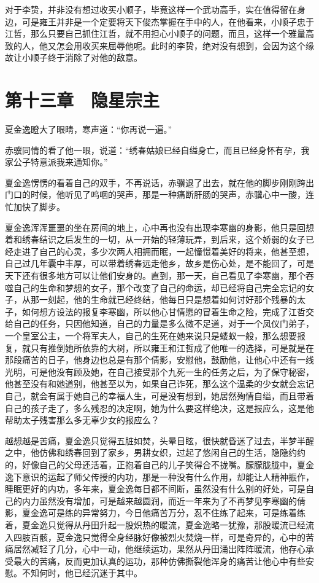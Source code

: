 对于李贽，并非没有想过收买小顺子，毕竟这样一个武功高手，实在值得留在身边，可是雍王并非是一个定要将天下俊杰掌握在手中的人，在他看来，小顺子忠于江哲，那么只要自己抓住江哲，就不用担心小顺子的问题，而且，这样一个雅量高致的人，他又怎会用收买来屈辱他呢。此时的李贽，绝对没有想到，会因为这个缘故让小顺子终于消除了对他的敌意。

\chapter{第十三章　隐星宗主}

夏金逸瞪大了眼睛，寒声道：“你再说一遍。”

赤骥同情的看了他一眼，说道：“绣春姑娘已经自缢身亡，而且已经身怀有孕，我家公子特意派我来通知你。”

夏金逸愣愣的看着自己的双手，不再说话，赤骥退了出去，就在他的脚步刚刚跨出门口的时候，他听见了呜咽的哭声，那是一种痛断肝肠的哭声，赤骥心中一酸，连忙加快了脚步。

夏金逸浑浑噩噩的坐在房间的地上，心中再也没有出现李寒幽的身影，他只是回想着和绣春结识之后发生的一切，从一开始的轻薄玩弄，到后来，这个娇弱的女子已经走进了自己的心灵，多少次两人相拥而眠，一起憧憬着美好的将来，他甚至想，自己过几年囊中丰厚，可以带着绣春远走他乡，故乡是伤心处，是不能回了，可是天下还有很多地方可以让他们安身的。直到，那一天，自己看见了李寒幽，那个吞噬自己的生命和梦想的女子，那个改变了自己的命运，却已经将自己完全忘记的女子，从那一刻起，他的生命就已经终结，他每日只是想着如何讨好那个残暴的太子，如何想方设法的报复李寒幽，所以他心甘情愿的冒着生命之险，完成了江哲交给自己的任务，只因他知道，自己的力量是多么微不足道，对于一个凤仪门弟子，一个皇室公主，一个将军夫人，自己的生死在她来说只是蝼蚁一般，那么想要报复，就只有推倒她所依靠的大树，所以雍王和江哲成了他唯一的选择，可是就是在那段痛苦的日子，他身边也总是有那个倩影，安慰他，鼓励他，让他心中还有一线光明，可是他没有顾及她，在自己接受那个九死一生的任务之后，为了保守秘密，他甚至没有和她道别，他甚至以为，如果自己诈死，那么这个温柔的少女就会忘记自己，就会有属于她自己的幸福人生，可是没有想到，她居然殉情自缢，而且带着自己的孩子走了，多么残忍的决定啊，她为什么要这样绝决，这是报应么，这是他帮助太子残害那么多无辜少女的报应么？

越想越是苦痛，夏金逸只觉得五脏如焚，头晕目眩，很快就昏迷了过去，半梦半醒之中，他仿佛和绣春回到了家乡，男耕女织，过起了悠闲自己的生活，隐隐约约的，好像自己的父母还活着，正抱着自己的儿子笑得合不拢嘴。朦朦胧胧中，夏金逸下意识的运起了师父传授的内功，那是一种没有什么作用，却能让人精神振作，睡眠更好的内功，多年来，夏金逸每日都不间断，虽然没有什么别的好处，可是自己的内力虽然没有增加，可是越来越圆润，而近一年来为了不再梦见李寒幽的倩影，夏金逸可是练的异常努力，今日他痛苦万分，忍不住练了起来，可是练着练着，夏金逸只觉得从丹田升起一股炽热的暖流，夏金逸略一犹豫，那股暖流已经流入四肢百骸，夏金逸只觉得全身经脉好像被烈火焚烧一样，可是奇异的，心中的苦痛居然减轻了几分，心中一动，他继续运功，果然从丹田涌出阵阵暖流，他存心承受最大的苦痛，反而更加认真的运功，那种仿佛撕裂他浑身的痛苦让他心中有些安慰。不知何时，他已经沉迷于其中。

